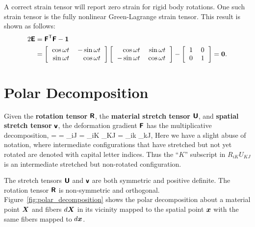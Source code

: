 A correct strain tensor will report zero strain for rigid body
rotations.  One such strain tensor is the fully nonlinear 
Green-Lagrange
strain tensor.  This result is shown as follows:
\begin{align}
 2 \tEbold &= \tFbold\transpose\tFbold - \vid \\
 &= 
 \left[
 \begin{tabular}{rr}
 $\cos \omega t$ & $-\sin \omega t$ \\
 $\sin \omega t$ & $\cos \omega t$ 
 \end{tabular}
 \right]
 \left[
 \begin{tabular}{rr}
 $\cos \omega t$ & $\sin \omega t$ \\
 $-\sin \omega t$ & $\cos \omega t$ 
 \end{tabular}
 \right]
 -   
 \left[
 \begin{tabular}{rr}
 $1$ & $0$ \\
 $0$ & $1$ 
 \end{tabular}
 \right] = \ve{0}. 
\end{align}






\section{Polar Decomposition}
Given the {\bf rotation tensor} $\mbox{\sffamily\bfseries R}$, the {\bf material stretch tensor} $\mbox{\sffamily\bfseries U}$, and {\bf spatial stretch tensor} $\mbox{\sffamily\bfseries v}$, the deformation gradient $\mbox{\sffamily\bfseries F}$ has the multiplicative decomposition,
\be
 \tFbold = \tRbold \tUbold = \tvbold \tRbold
 \;\; \Longleftrightarrow \;\;
 \tF_{iJ} = \tR_{iK} \; \tU_{KJ} = \tv_{ik} \; \tR_{kJ}, 
 \label{eq:polar_decomposition}
\ee
Here we have a slight abuse of notation, where intermediate configurations that have stretched but not yet rotated are denoted with capital letter indices.  Thus the ``$K$'' subscript in $R_{iK} U_{KJ}$ is an intermediate stretched but non-rotated configuration.

The stretch tensors $\mbox{\sffamily\bfseries U}$ and $\mbox{\sffamily\bfseries v}$ are both symmetric and positive definite.  The rotation tensor $\mbox{\sffamily\bfseries R}$ is non-symmetric and orthogonal.  Figure~\ref{fig:polar_decomposition} shows the polar decomposition about a material point $\mbox{\boldmath $X$}$ and fibers $d\mbox{\boldmath $X$}$ in its vicinity mapped to the spatial point $\mbox{\boldmath $x$}$ with the same fibers mapped to $d\mbox{\boldmath $x$}$.

